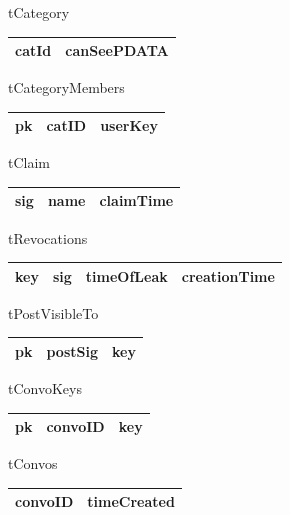 tCategory 
\begin{center}
    \begin{tabular}{ | l | l |}
    \hline
    catId & canSeePDATA \\ \hline
    \end{tabular}
\end{center}

tCategoryMembers
\begin{center}
    \begin{tabular}{ | l | l | l |}
    \hline
    pk & catID & userKey \\ \hline
    \end{tabular}
\end{center}

tClaim
\begin{center}
    \begin{tabular}{ | l | l | l |}
    \hline
    sig & name & claimTime \\ \hline
    \end{tabular}
\end{center}

tRevocations
\begin{center}
    \begin{tabular}{ | l | l | l | l |}
    \hline
    key & sig & timeOfLeak & creationTime \\ \hline
    \end{tabular}
\end{center}

tPostVisibleTo
\begin{center}
    \begin{tabular}{ | l | l | l |}
    \hline
    pk & postSig & key \\ \hline
    \end{tabular}
\end{center}

tConvoKeys
\begin{center}
    \begin{tabular}{ | l | l | l |}
    \hline
    pk & convoID & key \\ \hline
    \end{tabular}
\end{center}

tConvos
\begin{center}
    \begin{tabular}{ | l | l |}
    \hline
    convoID & timeCreated \\ \hline
    \end{tabular}
\end{center}

